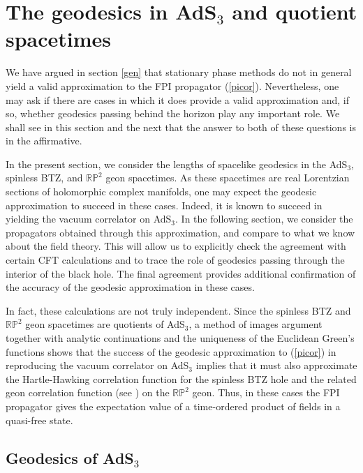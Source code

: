 \documentclass[a4paper,12pt]{article}
\begin{document}
\section{The geodesics in AdS$_3$ and quotient spacetimes}
\label{geo}

We have argued in section \ref{gen} that stationary phase methods do
not in general yield a valid approximation to the FPI propagator
(\ref{picor}).  Nevertheless, one may ask if there are cases in which
it does provide a valid approximation and, if so, whether geodesics
passing behind the horizon play any important role.  We shall see in
this section and the next that the answer to both of these questions
is in the affirmative.

In the present section, we consider the lengths of spacelike geodesics
in the AdS${}_3$, spinless BTZ, and ${\mathbb R} {\mathbb P}^2$ geon
spacetimes.  As these spacetimes are real Lorentzian sections of
holomorphic complex manifolds, one may expect the geodesic
approximation to succeed in these cases.  Indeed, it is known
\cite{holopart} to succeed in yielding the vacuum correlator on
AdS${}_3$. In the following section, we consider the propagators
obtained through this approximation, and compare to what we know about
the field theory. This will allow us to explicitly check the agreement
with certain CFT calculations and to trace the role of geodesics
passing through the interior of the black hole.  The final agreement
provides additional confirmation of the accuracy of the geodesic
approximation in these cases.

In fact, these calculations are not truly independent. Since the
spinless BTZ and ${\mathbb R}{\mathbb P}^2$ geon spacetimes are
quotients of AdS${}_3$, a method of images argument together with
analytic continuations and the uniqueness of the Euclidean Green's
functions shows that the success of the geodesic approximation to
(\ref{picor}) in reproducing the vacuum correlator on AdS$_3$ implies
that it must also approximate the Hartle-Hawking correlation function
for the spinless BTZ hole and the related geon correlation function
(see \cite{LM}) on the ${\mathbb R}{\mathbb P}^2$ geon. Thus, in
these cases the FPI propagator gives the expectation value of a
time-ordered product of fields in a quasi-free state.

\subsection{Geodesics of AdS$_3$}
\label{review}
\end{document}
